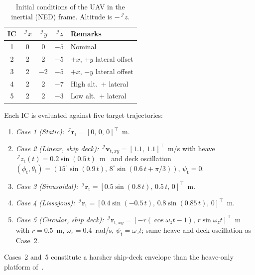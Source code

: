 \documentclass{IEEEtaes}
\begin{document}
\begin{table}[!t]
    \centering
    \caption{Initial conditions of the UAV in the inertial (NED) frame. Altitude is $-\,^\mathcal{I}z$.}
    \label{initial conditions: table}
    \begin{tabular}{ccccl}
    \toprule
        \textbf{IC} & $\,^\mathcal{I}x$ & $\,^\mathcal{I}y$ & $\,^\mathcal{I}z$ & \textbf{Remarks} \\
    \midrule
        1 & \phantom{-}0 & \phantom{-}0 & $-5$ & Nominal \\
        2 & \phantom{-}2 & \phantom{-}2 & $-5$ & $+x$, $+y$ lateral offset \\
        3 & \phantom{-}2 & $-2$         & $-5$ & $+x$, $-y$ lateral offset \\
        4 & \phantom{-}2 & \phantom{-}2 & $-7$ & High alt.\ $+$ lateral \\
        5 & \phantom{-}2 & \phantom{-}2 & $-3$ & Low alt.\ $+$ lateral \\
    \bottomrule
    \end{tabular}
\end{table}

Each IC is evaluated against five target trajectories:
\begin{enumerate}
    \item \textit{Case 1 (Static):}  $\,^\mathcal{I}\boldsymbol{r}_\text{t} = [0,\,0,\,0]^\top$~m.
    \item \textit{Case 2 (Linear, ship deck):} $\,^\mathcal{I}\boldsymbol{v}_{\text{t},xy} = [1.1,\,1.1]^\top$~m/s with heave $\,^\mathcal{I}z_\text{t}(t)=0.2\sin(0.5\,t)$~m~\cite{lin2022} and deck oscillation $(\phi_\text{t},\theta_\text{t})=(15^\circ\sin(0.9\,t),\,8^\circ\sin(0.6\,t+\pi/3))$, $\psi_\text{t}=0$.
    \item \textit{Case 3 (Sinusoidal):} $\,^\mathcal{I}\boldsymbol{r}_\text{t} = [0.5\sin(0.8\,t),\,0.5\,t,\,0]^\top$~m.
    \item \textit{Case 4 (Lissajous):} $\,^\mathcal{I}\boldsymbol{r}_\text{t} = [0.4\sin(-0.5\,t),\,0.8\sin(0.85\,t),\,0]^\top$~m.
    \item \textit{Case 5 (Circular, ship deck):} $\,^\mathcal{I}\boldsymbol{r}_{\text{t},xy} = [-r(\cos\omega_z t -1),\,r\sin\omega_z t]^\top$~m with $r=0.5$~m, $\omega_z = 0.4$~rad/s, $\psi_\text{t}=\omega_z t$; same heave and deck oscillation as Case~2.
\end{enumerate}
Cases~2 and~5 constitute a harsher ship-deck envelope than the heave-only platform of~\cite{lin2022}.
\end{document}
